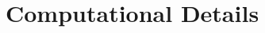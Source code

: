 \documentclass[fleqn]{article}
\begin{document}
\section{Computational Details}
\label{sec:computational_details}


    
\end{document}
